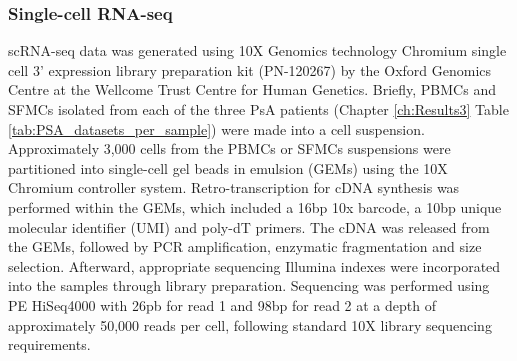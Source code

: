 \subsubsection{Single-cell RNA-seq} 
\label{scRNA_processing}
scRNA-seq data was generated using 10X Genomics technology Chromium single cell 3' expression library preparation kit (PN-120267) by the Oxford Genomics Centre at the Wellcome Trust Centre for Human Genetics. Briefly, PBMCs and SFMCs isolated from each of the three PsA patients (Chapter \ref{ch:Results3} Table \ref{tab:PSA_datasets_per_sample}) were made into a cell suspension. Approximately 3,000 cells from the PBMCs or SFMCs suspensions were partitioned into single-cell gel beads in emulsion (GEMs) using the 10X Chromium controller system. Retro-transcription for cDNA synthesis was performed within the GEMs, which included a 16bp 10x barcode, a 10bp unique molecular identifier (UMI) and poly-dT primers. The cDNA was released from the GEMs, followed by PCR amplification, enzymatic fragmentation and size selection. Afterward, appropriate sequencing Illumina indexes were incorporated into the samples through library preparation. Sequencing was performed using PE HiSeq4000 with 26pb for read 1 and 98bp for read 2 at a depth of approximately 50,000 reads per cell, following standard 10X library sequencing requirements. 







